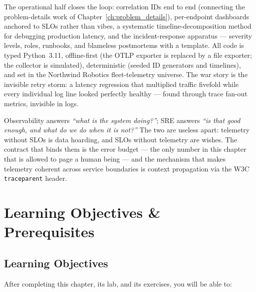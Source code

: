 The operational half closes the loop: correlation IDs end to end
(connecting the problem-details work of Chapter~\ref{ch:problem_details}),
per-endpoint dashboards anchored to SLOs rather than vibes, a systematic
timeline-decomposition method for debugging production latency, and the
incident-response apparatus --- severity levels, roles, runbooks, and
blameless postmortems with a template. All code is typed Python~3.11,
offline-first (the OTLP exporter is replaced by a file exporter; the
collector is simulated), deterministic (seeded ID generators and
timelines), and set in the Northwind Robotics fleet-telemetry universe.
The war story is the invisible retry storm: a latency regression that
multiplied traffic fivefold while every individual log line looked
perfectly healthy --- found through trace fan-out metrics, invisible in
logs.

\begin{keyconceptbox}
Observability answers \emph{``what is the system doing?''}; SRE answers
\emph{``is that good enough, and what do we do when it is not?''} The two
are useless apart: telemetry without SLOs is data hoarding, and SLOs
without telemetry are wishes. The contract that binds them is the error
budget --- the only number in this chapter that is allowed to page a human
being --- and the mechanism that makes telemetry coherent across service
boundaries is context propagation via the W3C \texttt{traceparent} header.
\end{keyconceptbox}

\section{Learning Objectives \& Prerequisites}
\label{sec:ch18-objectives}

\subsection*{Learning Objectives}
After completing this chapter, its lab, and its exercises, you will be able
to:


